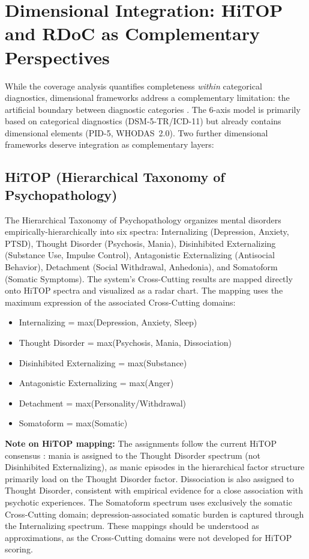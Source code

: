 \documentclass[11pt,a4paper]{article}
\begin{document}
\section{Dimensional Integration: HiTOP and RDoC as Complementary Perspectives}
\label{sec:dimensional}

While the coverage analysis quantifies completeness \textit{within} categorical diagnostics, dimensional frameworks address a complementary limitation: the artificial boundary between diagnostic categories \citep{Rosenman2003}. The 6-axis model is primarily based on categorical diagnostics (DSM-5-TR/ICD-11) but already contains dimensional elements (PID-5, WHODAS~2.0). Two further dimensional frameworks deserve integration as complementary layers:

\subsection{HiTOP (Hierarchical Taxonomy of Psychopathology)}

The Hierarchical Taxonomy of Psychopathology \citep{Kotov2017, Kotov2022, Krueger2018} organizes mental disorders empirically-hierarchically into six spectra: Internalizing (Depression, Anxiety, PTSD), Thought Disorder (Psychosis, Mania), Disinhibited Externalizing (Substance Use, Impulse Control), Antagonistic Externalizing (Antisocial Behavior), Detachment (Social Withdrawal, Anhedonia), and Somatoform (Somatic Symptoms). The system's Cross-Cutting results are mapped directly onto HiTOP spectra and visualized as a radar chart. The mapping uses the maximum expression of the associated Cross-Cutting domains:

\begin{itemize}[noitemsep]
\item Internalizing = max(Depression, Anxiety, Sleep)
\item Thought Disorder = max(Psychosis, Mania, Dissociation)
\item Disinhibited Externalizing = max(Substance)
\item Antagonistic Externalizing = max(Anger)
\item Detachment = max(Personality/Withdrawal)
\item Somatoform = max(Somatic)
\end{itemize}

\textbf{Note on HiTOP mapping:} The assignments follow the current HiTOP consensus \citep{Kotov2021}: mania is assigned to the Thought Disorder spectrum (not Disinhibited Externalizing), as manic episodes in the hierarchical factor structure primarily load on the Thought Disorder factor. Dissociation is also assigned to Thought Disorder, consistent with empirical evidence for a close association with psychotic experiences. The Somatoform spectrum uses exclusively the somatic Cross-Cutting domain; depression-associated somatic burden is captured through the Internalizing spectrum. These mappings should be understood as approximations, as the Cross-Cutting domains were not developed for HiTOP scoring.
\end{document}
